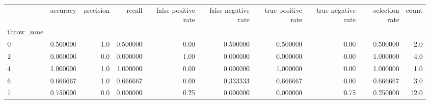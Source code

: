 \begin{tabular}{lrrrrrrrrr}
\toprule
{} &  accuracy &  precision &    recall &  false positive rate &  false negative rate &  true positive rate &  true negative rate &  selection rate &  count \\
throw\_zone &           &            &           &                      &                      &                     &                     &                 &        \\
\midrule
0          &  0.500000 &        1.0 &  0.500000 &                 0.00 &             0.500000 &            0.500000 &                0.00 &        0.500000 &    2.0 \\
2          &  0.000000 &        0.0 &  0.000000 &                 1.00 &             0.000000 &            0.000000 &                0.00 &        1.000000 &    4.0 \\
4          &  1.000000 &        1.0 &  1.000000 &                 0.00 &             0.000000 &            1.000000 &                0.00 &        1.000000 &    1.0 \\
6          &  0.666667 &        1.0 &  0.666667 &                 0.00 &             0.333333 &            0.666667 &                0.00 &        0.666667 &    3.0 \\
7          &  0.750000 &        0.0 &  0.000000 &                 0.25 &             0.000000 &            0.000000 &                0.75 &        0.250000 &   12.0 \\
\bottomrule
\end{tabular}
